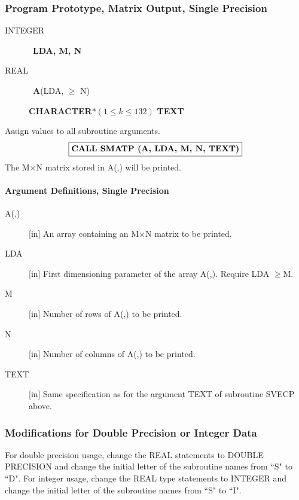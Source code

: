 \documentclass[twoside]{MATH77}
\begin{document}
\subsubsection{Program Prototype, Matrix Output, Single Precision}

\begin{description}

\item[INTEGER] \ {\bf LDA, M, N}

\item[REAL] \ {\bf A}(LDA, $\geq $ N)

{\bf CHARACTER$*(1 \leq k \leq 132)$} {\bf TEXT}

\end{description}

Assign values to all subroutine arguments.
$$
\fbox{\bf CALL SMATP (A, LDA, M, N, TEXT)}
$$
The M$\times\text{N}$ matrix stored in A(,) will be printed.

\paragraph{Argument Definitions, Single Precision}
\begin{description}
\item[A(,)]  [in] An array containing an M$\times\text{N}$ matrix to be printed.

\item[LDA]  [in] First dimensioning parameter of the array A(,). Require LDA $\geq
\text{M}.$

\item[M]  [in] Number of rows of A(,) to be printed.

\item[N]  [in] Number of columns of A(,) to be printed.

\item[TEXT]  [in] Same specification as for the argument TEXT of subroutine SVECP
above.
\end{description}

\subsubsection{Modifications for Double Precision or Integer Data}

For double precision usage, change the REAL statements to DOUBLE PRECISION
and change the initial letter of the subroutine names from ``S" to ``D".
For integer usage, change the REAL type statements to INTEGER and change the
initial letter of the subroutine names from ``S" to ``I".
\end{document}
